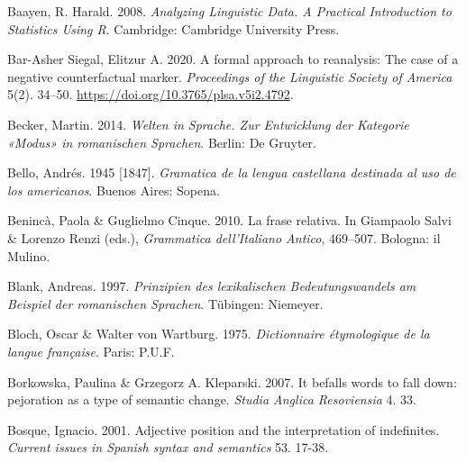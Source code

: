 \begin{styleStandard}
Baayen, R. Harald. 2008. \textit{Analyzing Linguistic Data. A Practical Introduction to Statistics Using R}. Cambridge: Cambridge University Press. 
\end{styleStandard}

\begin{styleStandard}
Bar-Asher Siegal, Elitzur A. 2020. A formal approach to reanalysis: The case of a negative counterfactual marker. \textit{Proceedings of the Linguistic Society of America} 5(2). 34–50. \url{https://doi.org/10.3765/plsa.v5i2.4792}.
\end{styleStandard}

\begin{styleStandard}
Becker, Martin. 2014. \textit{Welten in Sprache. Zur Entwicklung der Kategorie «Modus» in romanischen Sprachen}. Berlin: De Gruyter.
\end{styleStandard}

\begin{styleStandard}
Bello, Andrés. 1945 [1847]. \textit{Gramatica de la lengua castellana destinada al uso de los americanos}. Buenos Aires: Sopena.
\end{styleStandard}

\begin{styleStandard}
Benincà, Paola \& Guglielmo Cinque. 2010. La frase relativa. In Giampaolo Salvi \& Lorenzo Renzi (eds.), \textit{Grammatica dell’Italiano Antico}, 469–507. Bologna: il Mulino.
\end{styleStandard}

\begin{styleStandard}
Blank, Andreas. 1997. \textit{Prinzipien des lexikalischen Bedeutungswandels am Beispiel der romanischen Sprachen}. Tübingen: Niemeyer.
\end{styleStandard}

\begin{styleStandard}
Bloch, Oscar \& Walter von Wartburg. 1975. \textit{Dictionnaire étymologique de la langue française}. Paris: P.U.F.
\end{styleStandard}

\begin{styleStandard}
Borkowska, Paulina \& Grzegorz A. Kleparski. 2007. It befalls words to fall down: pejoration as a type of semantic change. \textit{Studia Anglica Resoviensia} 4. 33.
\end{styleStandard}

\begin{styleStandard}
Bosque, Ignacio. 2001. Adjective position and the interpretation of indefinites. \textit{Current issues in Spanish syntax and semantics} 53. 17-38.
\end{styleStandard}

